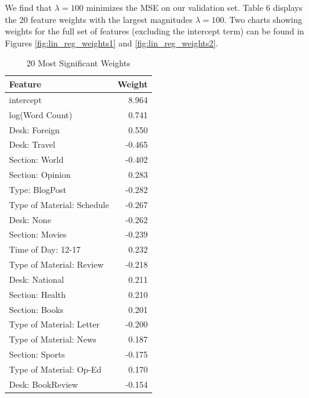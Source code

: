 \documentclass[fleqn,12pt]{SelfArx} %
\begin{document}
We find that $\lambda = 100$ minimizes the MSE on our validation set. Table 6 displays the 20 feature weights with the largest magnitudes $\lambda = 100$. Two charts showing weights for the full set of features (excluding the intercept term) can be found in Figures \ref{fig:lin_reg_weights1} and \ref{fig:lin_reg_weights2}.

\begin{table}[hbt]
\caption{20 Most Significant Weights}
\centering
\begin{tabular}{lr}
\toprule
Feature  &  Weight\\
\midrule
intercept & 8.964\\
log(Word Count) & 0.741\\
Desk: Foreign & 0.550\\
Desk: Travel & -0.465\\
Section: World & -0.402\\
Section: Opinion & 0.283\\
Type: BlogPost & -0.282\\
Type of Material: Schedule & -0.267\\
Desk: None & -0.262\\
Section: Movies & -0.239\\
Time of Day: 12-17 & 0.232\\
Type of Material: Review & -0.218\\
Desk: National & 0.211\\
Section: Health & 0.210\\
Section: Books & 0.201\\
Type of Material: Letter & -0.200\\
Type of Material: News & 0.187\\
Section: Sports & -0.175\\
Type of Material: Op-Ed & 0.170\\
Desk: BookReview & -0.154\\
\bottomrule
\end{tabular}
\end{table}
\end{document}
